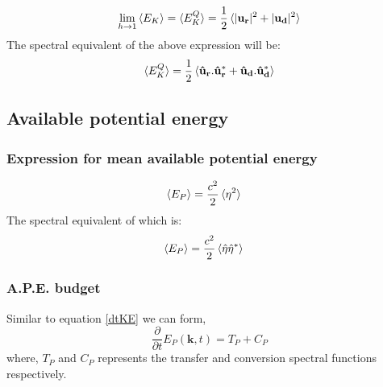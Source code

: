 \documentclass[a4paper,12pt]{paper}
\newcommand{\pder}[2][]{\frac{\partial#1}{\partial#2}}
\begin{document}
\begin{equation}
\lim_{h \to 1} \braket{E_K} = \braket{E_K^{Q}}
=  \frac{1}{2}\braket{|\mathbf{u_r}  | ^2 + | \mathbf{u_d} | ^2}
\end{equation}
The spectral equivalent of the above expression will be:
\begin{equation}
\braket{E_K^{Q} }
=  \frac{1}{2}\braket{ \mathbf{\hat{u}_r}.\mathbf{\hat{u}_r}^* + 
\mathbf{\hat{u}_d}.\mathbf{\hat{u}_d}^* }
\end{equation}

\subsection{Available potential energy}
\subsubsection{Expression for mean available potential energy}
\begin{align}
\braket{ E_P} 
& = \frac{c^2}{2} \braket{ \eta^2}
\end{align}
The spectral equivalent of which is:
\begin{align}
\braket{ E_P} 
& = \frac{c^2}{2} \braket{ \hat{\eta}\hat{\eta}^*}
\end{align}

\subsubsection{A.P.E. budget}
Similar to equation \eqref{dtKE} we can form,
\begin{equation}\label{dtPE}
 \pder{t}E_P(\mathbf{k},t) = T_P+ C_P
\end{equation}
where, $T_P$ and $C_P$ represents the transfer and conversion spectral 
functions respectively.
\end{document}
